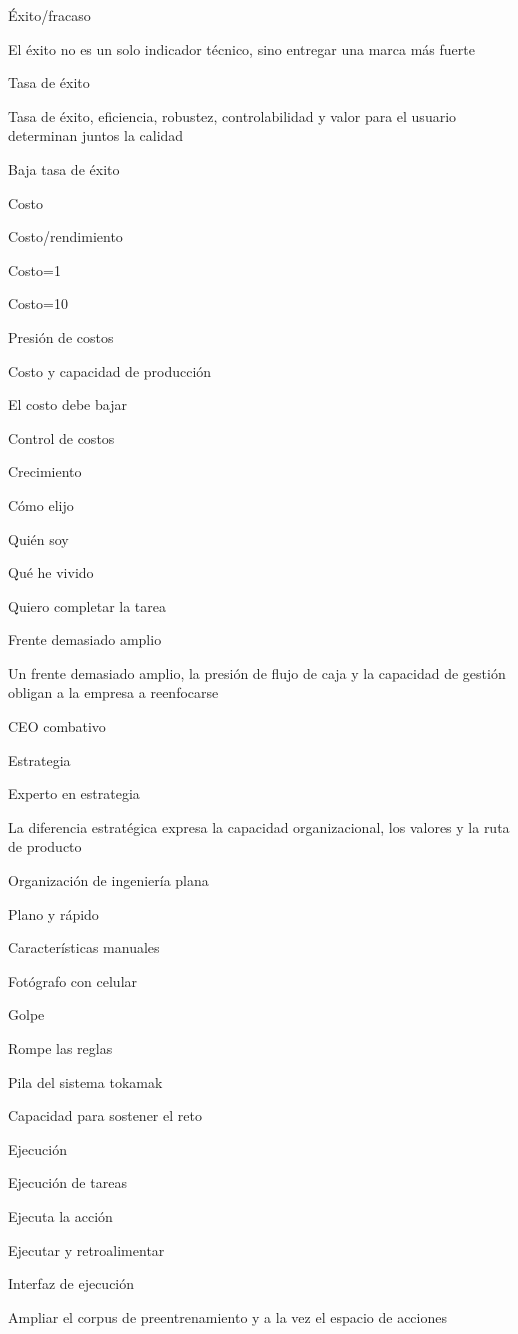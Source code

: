 \documentclass{article}
\begin{document}
Éxito/fracaso

El éxito no es un solo indicador técnico, sino entregar una marca más fuerte

Tasa de éxito

Tasa de éxito, eficiencia, robustez, controlabilidad y valor para el usuario determinan juntos la calidad

Baja tasa de éxito

Costo

Costo/rendimiento

Costo=1

Costo=10

Presión de costos

Costo y capacidad de producción

El costo debe bajar

Control de costos

Crecimiento

Cómo elijo

Quién soy

Qué he vivido

Quiero completar la tarea

Frente demasiado amplio

Un frente demasiado amplio, la presión de flujo de caja y la capacidad de gestión obligan a la empresa a reenfocarse

CEO combativo

Estrategia

Experto en estrategia

La diferencia estratégica expresa la capacidad organizacional, los valores y la ruta de producto

Organización de ingeniería plana

Plano y rápido

Características manuales

Fotógrafo con celular

Golpe

Rompe las reglas

Pila del sistema tokamak

Capacidad para sostener el reto

Ejecución

Ejecución de tareas

Ejecuta la acción

Ejecutar y retroalimentar

Interfaz de ejecución

Ampliar el corpus de preentrenamiento y a la vez el espacio de acciones
\end{document}
